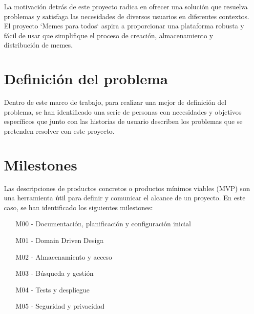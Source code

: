 La motivación detrás de este proyecto radica en ofrecer una solución que resuelva problemas y satisfaga las necesidades de diversos usuarios en diferentes contextos. El proyecto `Memes para todos` aspira a proporcionar una plataforma robusta y fácil de usar que simplifique el proceso de creación, almacenamiento y distribución de memes.

\section{Definición del problema}

Dentro de este marco de trabajo, para realizar una mejor de definición del problema, se han identificado una serie de personas con necesidades y objetivos específicos que junto con las historias de usuario describen los problemas que se pretenden resolver con este proyecto.

\section{Milestones}

Las descripciones de productos concretos o productos mínimos viables (MVP) son una herramienta útil para definir y comunicar el alcance de un proyecto. En este caso, se han identificado los siguientes milestones:

\begin{enumerate}
    \item [M00] - Documentación, planificación y configuración inicial
    \item [M01] - Domain Driven Design
    \item [M02] - Almacenamiento y acceso
    \item [M03] - Búsqueda y gestión
    \item [M04] - Tests y despliegue
    \item [M05] - Seguridad y privacidad
\end{enumerate}